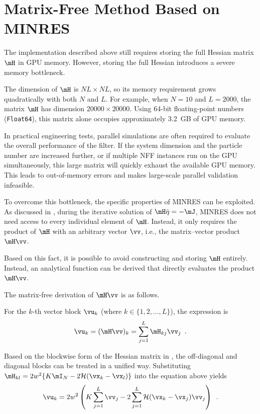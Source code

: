 \section{Matrix-Free Method Based on MINRES}
\label{sec:matrix_free}

The implementation described above still requires storing the full Hessian matrix $\mH$ in GPU memory. However, storing the full Hessian introduces a severe memory bottleneck.

The dimension of $\mH$ is $NL \times NL$, so its memory requirement grows quadratically with both $N$ and $L$. For example, when $N=10$ and $L=2000$, the matrix $\mH$ has dimension $20000 \times 20000$. Using 64-bit floating-point numbers (\texttt{Float64}), this matrix alone occupies approximately 3.2~GB of GPU memory.

In practical engineering tests, parallel simulations are often required to evaluate the overall performance of the filter. If the system dimension and the particle number are increased further, or if multiple NFF instances run on the GPU simultaneously, this large matrix will quickly exhaust the available GPU memory. This leads to out-of-memory errors and makes large-scale parallel validation infeasible.

To overcome this bottleneck, the specific properties of MINRES can be exploited. As discussed in , during the iterative solution of $\mH\dot{\eta} = -\mJ$, MINRES does not need access to every individual element of $\mH$. Instead, it only requires the product of $\mH$ with an arbitrary vector $\vv$, i.e., the matrix--vector product $\mH\vv$.

Based on this fact, it is possible to avoid constructing and storing $\mH$ entirely. Instead, an analytical function can be derived that directly evaluates the product $\mH\vv$.

The matrix-free derivation of $\mH\vv$ is as follows.

For the $k$-th vector block $\vu_k$ (where $k \in \{1, 2, \dots, L\}$), the expression is
\begin{equation}
	\vu_k = (\mH\vv)_k = \sum_{j=1}^L \mH_{kj}\vv_j \enspace .
\end{equation}

Based on the blockwise form of the Hessian matrix in , the off-diagonal and diagonal blocks can be treated in a unified way. Substituting $\mH_{kl} = 2w^2 \{ K\mI_N - 2\mathcal{H}(\vx_k - \vx_l) \}$ into the equation above yields
\begin{equation}
	\vu_k = 2w^2 \left( K \sum_{j=1}^L \vv_j - 2 \sum_{j=1}^L \mathcal{H}(\vx_k - \vx_j)\vv_j \right) \enspace .
\end{equation}

